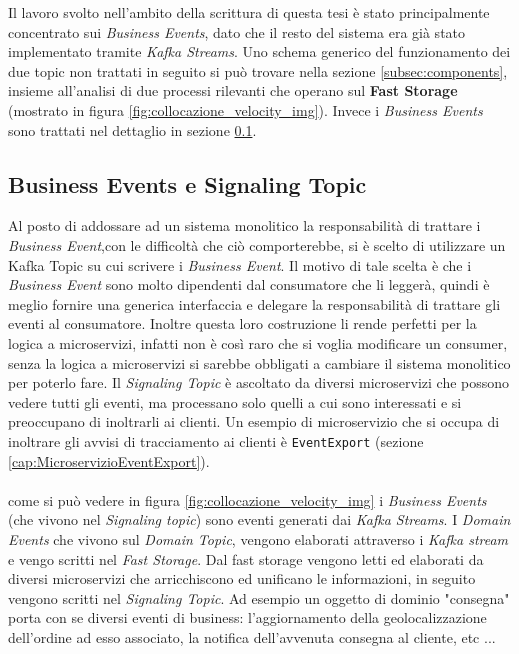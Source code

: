 Il lavoro svolto nell'ambito della scrittura di questa tesi è stato principalmente concentrato sui \textit{Business Events}, 
dato che il resto del sistema era già stato implementato tramite \textit{Kafka Streams}.
Uno schema generico del funzionamento dei due topic non trattati in seguito si può trovare nella sezione \ref{subsec:components}, insieme all'analisi di due processi
rilevanti che operano sul \textbf{Fast Storage} (mostrato in figura \ref{fig:collocazione_velocity_img}).
Invece i \textit{Business Events} sono trattati nel dettaglio in sezione \ref{subsec:business_events}.

\subsection{Business Events e Signaling Topic}
\label{subsec:business_events}
Al posto di addossare ad un sistema monolitico la responsabilità di trattare i \textit{Business Event},con le difficoltà che ciò comporterebbe,
si è scelto di utilizzare un Kafka Topic su cui scrivere i \textit{Business Event}. 
Il motivo di tale scelta è che i \textit{Business Event} sono molto dipendenti dal consumatore che li leggerà, quindi è meglio fornire una generica interfaccia
e delegare la responsabilità di trattare gli eventi al consumatore.
Inoltre questa loro costruzione li rende perfetti per la logica a microservizi, infatti non è così raro che si voglia modificare un consumer, senza la logica a microservizi
si sarebbe obbligati a cambiare il sistema monolitico per poterlo fare.
Il \textit{Signaling Topic} è ascoltato da diversi microservizi che possono vedere tutti gli eventi, ma processano solo quelli a cui sono interessati e si preoccupano di inoltrarli ai clienti.
Un esempio di microservizio che si occupa di inoltrare gli avvisi di tracciamento ai clienti è \texttt{EventExport} (sezione \ref{cap:MicroservizioEventExport}).
\\\\
come si può vedere in figura \ref{fig:collocazione_velocity_img} i \textit{Business Events} (che vivono nel \textit{Signaling topic}) sono eventi generati dai \textit{Kafka Streams}.
I \textit{Domain Events} che vivono sul \textit{Domain Topic}, vengono elaborati attraverso i \textit{Kafka stream} e vengo scritti nel \textit{Fast Storage}.
Dal fast storage vengono letti ed elaborati da diversi microservizi che arricchiscono ed unificano le informazioni, in seguito vengono scritti nel \textit{Signaling Topic}.
Ad esempio un oggetto di dominio "consegna" porta con se diversi eventi di business: l'aggiornamento della geolocalizzazione dell'ordine ad esso associato, la notifica dell'avvenuta consegna al cliente, etc ...
